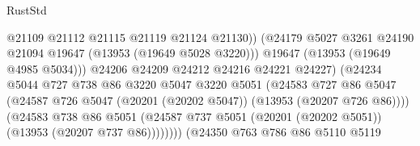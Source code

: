 \begin{lexlean}{RustStd}
\begin{coremodule}
                                            @21109
                                            @21112
                                            @21115
                                            @21119
                                            @21124
                                            @21130))
                                        (@24179
                                          @5027
                                          @3261
                                          @24190
                                          @21094
                                          @19647
                                          (@13953 (@19649 @5028 @3220)))
                                        @19647
                                        (@13953 (@19649 @4985 @5034)))
                                      @24206
                                      @24209
                                      @24212
                                      @24216
                                      @24221
                                      @24227)
                                    (@24234
                                      @5044
                                      @727
                                      @738
                                      @86
                                      @3220
                                      @5047
                                      @3220
                                      @5051
                                      (@24583
                                        @727
                                        @86
                                        @5047
                                        (@24587
                                          @726
                                          @5047
                                          (@20201 (@20202 @5047))
                                          (@13953 (@20207 @726 @86))))
                                      (@24583
                                        @738
                                        @86
                                        @5051
                                        (@24587
                                          @737
                                          @5051
                                          (@20201 (@20202 @5051))
                                          (@13953 (@20207 @737 @86))))))))
                              (@24350
                                @763
                                @786
                                @86
                                @5110
                                @5119

\end{coremodule}
\end{lexlean}
